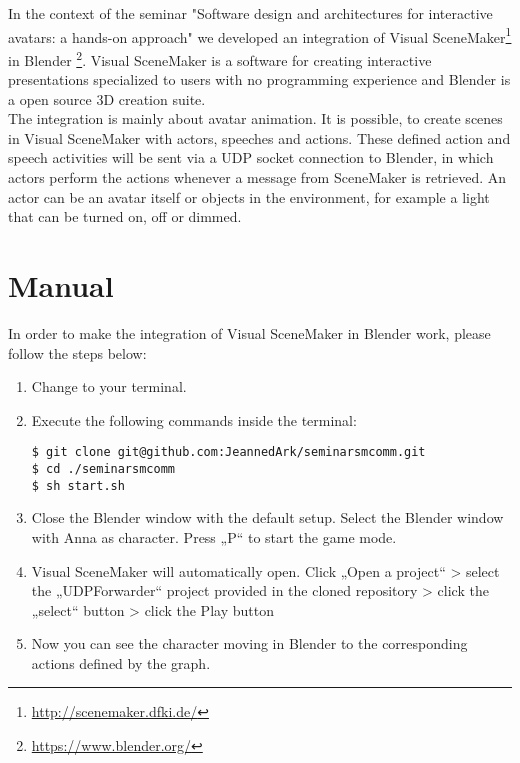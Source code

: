 \documentclass[
10pt, %
a4paper, %
oneside,
headinclude,footinclude, %
BCOR 0mm, %
]{scrartcl}
\begin{document}
In the context of the seminar "Software design and architectures for interactive avatars: a hands-on approach" we developed an integration of Visual SceneMaker\footnote{\url{http://scenemaker.dfki.de/}} in Blender \footnote{\url{https://www.blender.org/}}.
Visual SceneMaker is a software for creating interactive presentations specialized to users with no programming experience and Blender is a open source 3D creation suite.\\
The integration is mainly about avatar animation. It is possible, to create scenes in Visual SceneMaker with actors, speeches and actions. These defined action and speech activities will be sent via a UDP socket connection to Blender, in which actors perform the actions whenever a message from SceneMaker is retrieved. An actor can be an avatar itself or objects in the environment, for example a light that can be turned on, off or dimmed.

\section{Manual}
In order to make the integration of Visual SceneMaker in Blender work, please follow the steps below:
\begin{enumerate}[noitemsep] %
\item Change to your terminal.
\item Execute the following commands inside the terminal:
\begin{lstlisting}
$ git clone git@github.com:JeannedArk/seminarsmcomm.git
$ cd ./seminarsmcomm
$ sh start.sh
\end{lstlisting}
\item Close the Blender window with the default setup. Select the Blender window with Anna as character. Press „P“ to start the game mode.
\item Visual SceneMaker will automatically open. Click „Open a project“ > select the „UDPForwarder“ project provided in the cloned repository > click the „select“ button > click the Play button
\item Now you can see the character moving in Blender to the corresponding actions defined by the graph.
\end{enumerate}

\end{document}
